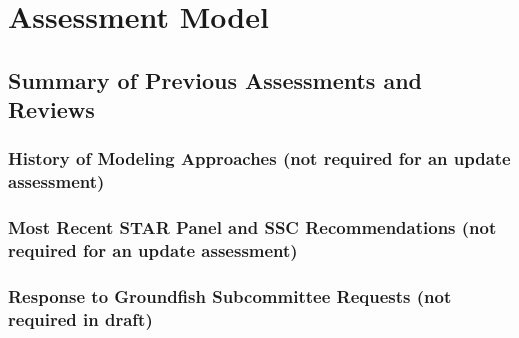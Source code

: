 \documentclass[11pt,
  english,
  a4paper,
]{article}
\begin{document}
\leavevmode\tagmcend\tagstructend


\hypertarget{assessment-model}{%
\section{Assessment Model}\label{assessment-model}}

\leavevmode\tagmcend\tagstructend


\hypertarget{summary-of-previous-assessments-and-reviews}{%
\subsection{Summary of Previous Assessments and Reviews}\label{summary-of-previous-assessments-and-reviews}}

\leavevmode\tagmcend\tagstructend


\hypertarget{history-of-modeling-approaches-not-required-for-an-update-assessment}{%
\subsubsection{History of Modeling Approaches (not required for an update assessment)}\label{history-of-modeling-approaches-not-required-for-an-update-assessment}}

\leavevmode\tagmcend\tagstructend


\hypertarget{most-recent-star-panel-and-ssc-recommendations-not-required-for-an-update-assessment}{%
\subsubsection{Most Recent STAR Panel and SSC Recommendations (not required for an update assessment)}\label{most-recent-star-panel-and-ssc-recommendations-not-required-for-an-update-assessment}}

\leavevmode\tagmcend\tagstructend


\hypertarget{response-to-groundfish-subcommittee-requests-not-required-in-draft}{%
\subsubsection{Response to Groundfish Subcommittee Requests (not required in draft)}\label{response-to-groundfish-subcommittee-requests-not-required-in-draft}}
\end{document}

